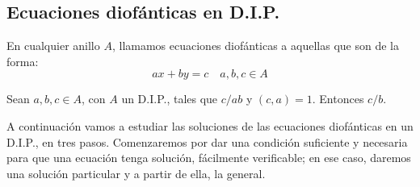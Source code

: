 \subsection{Ecuaciones diofánticas en D.I.P.}

En cualquier anillo $A$, llamamos ecuaciones diofánticas a aquellas que son de la forma:
\[
ax +by  = c \quad a,b,c \in A
\]

\begin{nprop}
  Sean $a,b,c \in A$, con $A$ un D.I.P., tales que $c/ab$ y $(c,a)=1$. Entonces $c/b$.
\end{nprop}

A continuación vamos a estudiar las soluciones de las ecuaciones diofánticas en un D.I.P., en tres pasos.
Comenzaremos por dar una condición suficiente y necesaria para que una ecuación tenga solución,
fácilmente verificable; en ese caso, daremos una solución particular y a partir de ella, la general.

